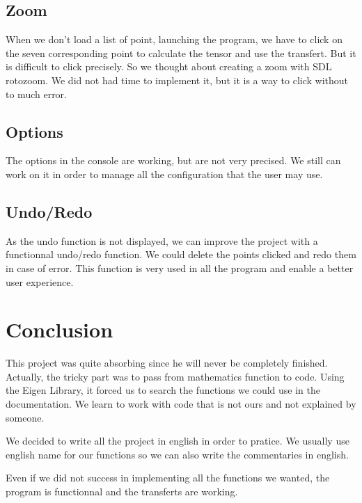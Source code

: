 \documentclass{report}
\begin{document}
\subsection{Zoom}
When we don't load a list of point, launching the program, we have to click on the seven corresponding point to calculate the tensor and use the transfert. But it is difficult to click precisely. So we thought about creating a zoom with SDL rotozoom. We did not had time to implement it, but it is a way to click without to much error.

\subsection{Options}
The options in the console are working, but are not very precised. We still can work on it in order to manage all the configuration that the user may use. 

\subsection{Undo/Redo}
As the undo function is not displayed, we can improve the project with a functionnal undo/redo function. We could delete the points clicked and redo them in case of error. This function is very used in all the program and enable a better user experience. 

\newpage
\section{Conclusion}
This project was quite absorbing since he will never be completely finished. Actually, the tricky part was to pass from mathematics function to code. Using the Eigen Library, it forced us to search the functions we could use in the documentation. We learn to work with code that is not ours and not explained by someone. 



We decided to write all the project in english in order to pratice. We usually use english name for our functions so we can also write the commentaries in english. 

Even if we did not success in implementing all the functions we wanted, the program is functionnal and the transferts are working. 
\end{document}
